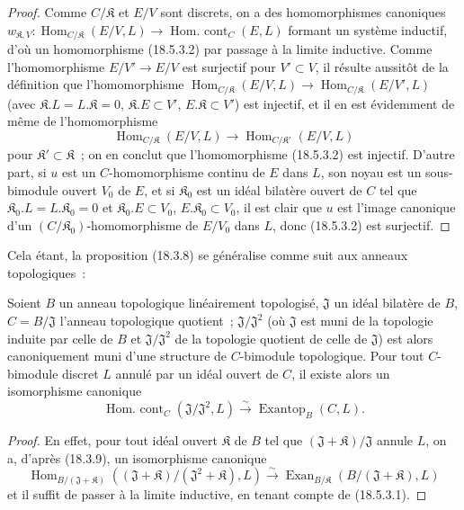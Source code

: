 \begin{proof}
Comme $C/\mathfrak K$ et $E/V$ sont discrets, on a des homomorphismes
canoniques
$w_{\mathfrak K,V}:\operatorname{Hom}_{C/\mathfrak K}(E/V,L)\longrightarrow\operatorname{Hom.\ cont}_C(E,L)$
formant un système inductif, d'où un homomorphisme (18.5.3.2) par passage à la
limite inductive. Comme l'homomorphisme $E/V'\to E/V$ est surjectif pour
$V'\subset V$, il résulte aussitôt de la définition que l'homomorphisme
$\operatorname{Hom}_{C/\mathfrak K}(E/V,L)\longrightarrow\operatorname{Hom}_{C/\mathfrak K}(E/V',L)$
(avec $\mathfrak K.L=L.\mathfrak K=0$, $\mathfrak K.E\subset V'$,
$E.\mathfrak K\subset V'$) est injectif, et il en est évidemment de même de
l'homomorphisme
\[
  \operatorname{Hom}_{C/\mathfrak K}(E/V,L)
  \longrightarrow\operatorname{Hom}_{C/\mathfrak K'}(E/V,L)
\]
pour $\mathfrak K'\subset\mathfrak K$~; on en conclut que l'homomorphisme
(18.5.3.2) est injectif. D'autre part, si $u$ est un $C$-homomorphisme continu
de $E$ dans $L$, son noyau est un sous-bimodule ouvert $V_0$ de $E$, et si
$\mathfrak K_0$ est un idéal bilatère ouvert de $C$ tel que
$\mathfrak K_0.L=L.\mathfrak K_0=0$ et $\mathfrak K_0.E\subset V_0$,
$E.\mathfrak K_0\subset V_0$, il est clair que $u$ est l'image canonique d'un
$(C/\mathfrak K_0)$-homomorphisme de $E/V_0$ dans $L$, donc (18.5.3.2) est
surjectif.
\end{proof}

Cela étant, la proposition (18.3.8) se généralise comme suit aux anneaux
topologiques~:

\begin{proposition}[18.5.4]
\label{0.18.5.4-fr}
Soient $B$ un anneau topologique linéairement topologisé, $\mathfrak J$ un
idéal bilatère de $B$, $C=B/\mathfrak J$ l'anneau topologique quotient~;
$\mathfrak J/\mathfrak J^2$ (où $\mathfrak J$ est muni de la topologie induite
par celle de $B$ et $\mathfrak J/\mathfrak J^2$ de la topologie quotient de
celle de $\mathfrak J$) est alors canoniquement muni d'une structure de
$C$-bimodule topologique. Pour tout $C$-bimodule discret $L$ annulé par un
idéal ouvert de $C$, il existe alors un isomorphisme canonique
\begin{equation}
\label{0.18.5.4.1-fr}
\tag{18.5.4.1}
  \operatorname{Hom.\ cont}_C(\mathfrak J/\mathfrak J^2,L)
  \xrightarrow{\sim}\operatorname{Exantop}_B(C,L).
\end{equation}
\end{proposition}

\begin{proof}
En effet, pour tout idéal ouvert $\mathfrak K$ de $B$ tel que
$(\mathfrak J+\mathfrak K)/\mathfrak J$ annule $L$, on a, d'après (18.3.9),
un isomorphisme canonique
\[
  \operatorname{Hom}_{B/(\mathfrak J+\mathfrak K)}
    ((\mathfrak J+\mathfrak K)/(\mathfrak J^2+\mathfrak K),L)
  \xrightarrow{\sim}
  \operatorname{Exan}_{B/\mathfrak K}(B/(\mathfrak J+\mathfrak K),L)
\]
et il suffit de passer à la limite inductive, en tenant compte de (18.5.3.1).
\end{proof}
